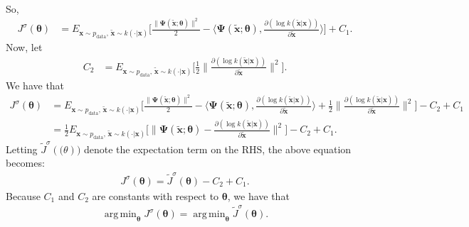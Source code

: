 \documentclass[10pt]{article}
\newcommand{\ve}[1]{\mathbf{#1}}
\newcommand{\mrm}[1]{\mathrm{#1}}
\newcommand{\ves}[1]{\boldsymbol{#1}}
\DeclareMathOperator*{\argmin}{arg\,min}
\begin{document}
\begin{itemize}
\begin{align*}
  \end{align*}
  So,
  \begin{align*}
    J^\sigma(\ves{\theta}) 
    &= E_{\ve{x}\sim p_{\mrm{data}},\, \widetilde{\ve{x}} \sim k(\cdot|\ve{x})} \bigg[
      \frac{\| \ves{\Psi}(\widetilde{\ve{x}};\ves{\theta}) \|^2}{2}
      - \bigg\langle \ves{\Psi}(\widetilde{\ve{x}};\ves{\theta}),  \frac{\partial (\log k(\widetilde{\ve{x}}|\ve{x})) }{\partial \widetilde{\ve{x}}} \bigg\rangle \bigg] + C_1.
  \end{align*}
  Now, let
  \begin{align*}
    C_2 
    &= E_{\ve{x}\sim p_{\mrm{data}},\, \widetilde{\ve{x}} \sim k(\cdot|\ve{x})} \bigg[ \frac{1}{2} \bigg\| \frac{\partial (\log k(\widetilde{\ve{x}}|\ve{x})) }{\partial \widetilde{\ve{x}}} \bigg\|^2 \bigg].
  \end{align*}
  We have that
  \begin{align*}
    J^\sigma(\ves{\theta}) 
    &= E_{\ve{x}\sim p_{\mrm{data}},\, \widetilde{\ve{x}} \sim k(\cdot|\ve{x})} \bigg[
      \frac{\| \ves{\Psi}(\widetilde{\ve{x}};\ves{\theta}) \|^2}{2}
      - \bigg\langle \ves{\Psi}(\widetilde{\ve{x}};\ves{\theta}),  \frac{\partial (\log k(\widetilde{\ve{x}}|\ve{x})) }{\partial \widetilde{\ve{x}}} \bigg\rangle + \frac{1}{2} \bigg\| \frac{\partial (\log k(\widetilde{\ve{x}}|\ve{x})) }{\partial \widetilde{\ve{x}}} \bigg\|^2 \bigg] - C_2 + C_1 \\
    &= \frac{1}{2} E_{\ve{x}\sim p_{\mrm{data}},\, \widetilde{\ve{x}} \sim k(\cdot|\ve{x})} \bigg[ \bigg\| \ves{\Psi}(\widetilde{\ve{x}};\ves{\theta}) - \frac{\partial (\log k(\widetilde{\ve{x}}|\ve{x})) }{\partial \widetilde{\ve{x}}} \bigg\|^2 \bigg] - C_2 + C_1.
  \end{align*}
  Letting $\widetilde{J}^\sigma(\ves(\theta))$ denote the expectation term on the RHS, the above equation becomes:
  \begin{align*}
    J^\sigma(\ves{\theta}) = \widetilde{J}^\sigma(\ves{\theta}) - C_2 + C_1.
  \end{align*}
  Because $C_1$ and $C_2$ are constants with respect to $\ves{\theta}$, we have that
  \begin{align*}
    \argmin_{\ves{\theta}} J^\sigma(\ves{\theta}) = \argmin_{\ves{\theta}} \widetilde{J}^\sigma(\ves{\theta}).
  \end{align*}


\end{itemize}
\end{document}
